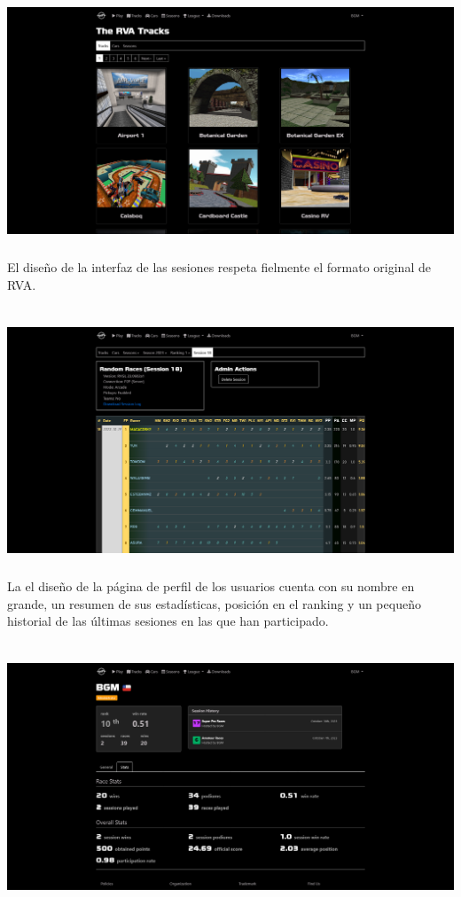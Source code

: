 \includegraphics[width=15cm, height=8cm]{img/tracks.png} \\

El diseño de la interfaz de las sesiones respeta fielmente el formato original de RVA.

\includegraphics[width=15cm, height=8cm]{img/session.png} \\

La el diseño de la página de perfil de los usuarios cuenta con su nombre en grande, un resumen de sus estadísticas, posición en el ranking y un pequeño historial de las últimas sesiones en las que han participado.

\includegraphics[width=15cm, height=8cm]{img/profile1.png} \\

